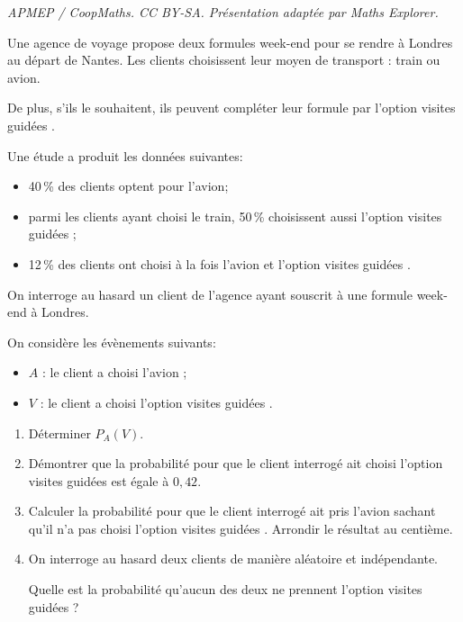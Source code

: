\documentclass[10pt]{article}
\begin{document}
\noindent\textit{APMEP / CoopMaths. CC BY-SA. Présentation adaptée par Maths Explorer.}\par\medskip
\medskip

Une agence de voyage propose deux formules week-end pour se rendre à Londres au départ de Nantes. Les clients choisissent leur moyen de transport : train ou avion.

De plus, s'ils le souhaitent, ils peuvent compléter leur formule par l'option \og visites guidées \fg.

Une étude a produit les données suivantes:

\setlength\parindent{9mm}
\begin{itemize}
\item[$\bullet~~$] 40\,\% des clients optent pour l'avion;
\item[$\bullet~~$]parmi les clients ayant choisi le train, 50\,\% choisissent aussi l'option \og visites guidées \fg{} ;
\item[$\bullet~~$]12\,\% des clients ont choisi à la fois l'avion et l'option \og visites guidées \fg.
\end{itemize}
\setlength\parindent{0mm}

\smallskip

On interroge au hasard un client de l'agence ayant souscrit à une formule week-end à Londres.

On considère les évènements suivants:

\setlength\parindent{9mm}
\begin{itemize}
\item $A$ : \og le client a choisi l'avion\fg{} ;
\item $V$ : \og le client a choisi l'option \og visites guidées \fg{}\fg.
\end{itemize}
\setlength\parindent{0mm}

\medskip

\begin{enumerate}
\item Déterminer $P_A(V)$.
\item Démontrer que la probabilité pour que le client interrogé ait choisi l'option
\og visites guidées\fg{} est égale à $0,42$.
\item Calculer la probabilité pour que le client interrogé ait pris l'avion sachant qu'il
n'a pas choisi l'option \og visites guidées \fg. Arrondir le résultat au centième.
\item On interroge au hasard deux clients de manière aléatoire et indépendante.

Quelle est la probabilité qu'aucun des deux ne prennent l'option \og visites guidées\fg{} ?
\end{enumerate}
\end{document}
